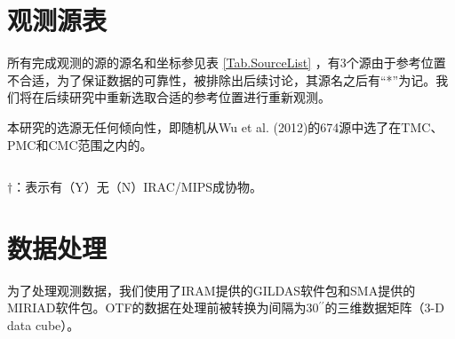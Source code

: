 \documentclass[UTF8, nocolorlinks]{pkuthss}
\newcommand{\arcsec}{$^{\prime\prime}$}
\begin{document}
    \section{观测源表}
        所有完成观测的源的源名和坐标参见表 \ref{Tab.SourceList} ，有3个源由于参考位置不合适，为了保证数据的可靠性，被排除出后续讨论，其源名之后有“*”为记。我们将在后续研究中重新选取合适的参考位置进行重新观测。

        本研究的选源无任何倾向性，即随机从Wu et al. (2012)的674源中选了在TMC、PMC和CMC范围之内的\supercite{wu2012gas}。

        \label{Tab.SourceList}
			\begin{footnotesize}
			\begin{center}
			\setlength{\tabcolsep}{0.04in}
			\tablelasttail{\hline\bottomrule}
			\begin{supertabular}{lllcccclr}
			
			\end{supertabular}		
			\end{center}
			$\dagger$：表示有（Y）无（N）IRAC/MIPS成协物。
			\end{footnotesize}

	\section{数据处理}
        为了处理观测数据，我们使用了IRAM提供的GILDAS软件包\supercite{2000ASPC..217..299G}和SMA提供的MIRIAD软件包\supercite{1995ASPC...77..433S}。OTF的数据在处理前被转换为间隔为30\arcsec 的三维数据矩阵（3-D data cube）。
\end{document}
